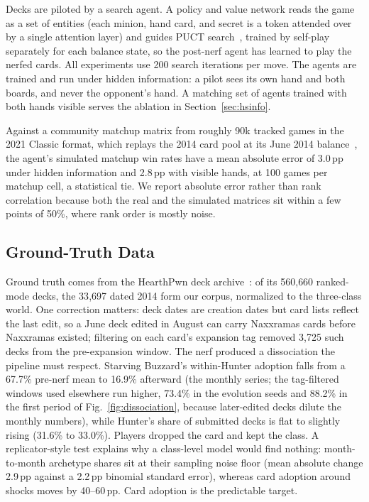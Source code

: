 \documentclass[journal]{IEEEtran}
\newcommand{\pp}{\,\text{pp}}
\begin{document}
Decks are piloted by a search agent. A policy and value network reads the
game as a set of entities (each minion, hand card, and secret is a token
attended over by a single attention layer) and guides PUCT
search~\cite{rosin2011episodecontext,silver2017alphagozero}, trained by
self-play~\cite{silver2018alphazero} separately for each balance state, so the post-nerf agent has learned to play the nerfed
cards. All experiments use 200 search iterations per move. The agents are
trained and run under hidden information: a pilot sees its own hand and
both boards, and never the opponent's hand. A matching set of agents
trained with both hands visible serves the ablation in
Section~\ref{sec:hsinfo}.

Against a community matchup matrix from roughly 90k tracked games in
the 2021 Classic format, which replays the 2014 card pool at its June
2014 balance~\cite{vicious_syndicate}, the agent's
simulated matchup win rates have a mean absolute error of 3.0$\pp$ under
hidden information and 2.8$\pp$ with visible hands, at 100 games per
matchup cell, a statistical tie. We report absolute error rather than
rank correlation because both the real and the simulated matrices sit
within a few points of 50\%, where rank order is mostly noise.

\subsection{Ground-Truth Data}

Ground truth comes from the HearthPwn deck archive~\cite{mora2022archetypes,zenodo_dataset}:
of its 560{,}660 ranked-mode decks, the 33{,}697 dated 2014 form our
corpus, normalized to the three-class world. One correction matters: deck dates
are creation dates but card lists reflect the last edit, so a June deck
edited in August can carry Naxxramas cards before Naxxramas existed;
filtering on each card's expansion tag removed 3{,}725 such decks from the
pre-expansion window. The nerf produced a dissociation the pipeline must
respect. Starving Buzzard's within-Hunter adoption falls from a 67.7\% pre-nerf mean to 16.9\% afterward (the monthly series; the tag-filtered windows used elsewhere run higher, 73.4\% in the evolution seeds and 88.2\% in the first period of Fig.~\ref{fig:dissociation}, because later-edited decks dilute the monthly numbers), while Hunter's share of submitted decks
is flat to slightly rising (31.6\% to 33.0\%). Players dropped the card
and kept the class. A replicator-style test explains why a class-level
model would find nothing: month-to-month archetype shares sit at their
sampling noise floor (mean absolute change 2.9$\pp$ against a 2.2$\pp$
binomial standard error), whereas card adoption around shocks moves by
40--60$\pp$. Card adoption is the predictable target.
\end{document}
